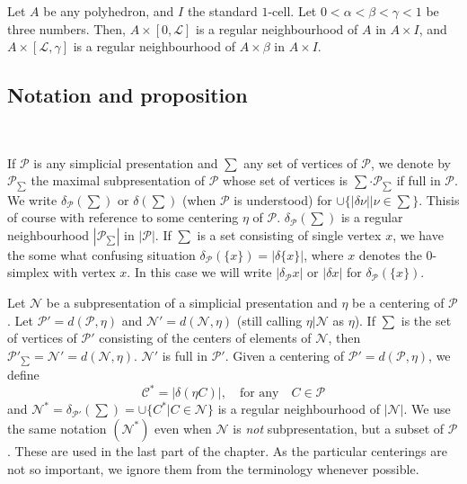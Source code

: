 \begin{ex}\label{chap6-ex6.3.9}
Let $A$ be any polyhedron, and $I$ the standard $1$-cell. Let $0<\alpha<\beta<\gamma<1$ be three numbers. Then, $A\times[0,\mathcal{L}]$ is a regular neighbourhood of $A$ in $A\times I$, and $A\times [\mathcal{L},\gamma]$ is a regular neighbourhood of $A\times \beta$ in $A\times I$.
\end{ex}

\setcounter{subsection}{9}
\subsection{Notation and proposition}\label{chap6-sec6.3.10}

~\phantom{a}

If $\mathscr{P}$ is any simplicial presentation and $\sum$ any set of vertices of $\mathscr{P}$, we denote by $\mathscr{P}_{\sum}$ the maximal subpresentation of $\mathscr{P}$ whose set of vertices is $\sum\cdot \mathscr{P}_{\sum}$ if full in $\mathscr{P}$. We write $\delta_{\mathscr{P}}(\sum)$ or $\delta(\sum)$ (when $\mathscr{P}$ is understood) for $\cup\{|\delta\nu||\nu\in \sum\}$. This\pageoriginale is of course with reference to some centering $\eta$ of $\mathscr{P}$. $\delta_{\mathscr{P}}(\sum)$ is a regular neighbourhood $|\mathscr{P}_{\sum}|$ in $|\mathscr{P}|$. If $\sum$ is a set consisting of single vertex $x$, we have the some what confusing situation $\delta_{\mathscr{P}}(\{x\})=|\delta\{x\}|$, where $x$ denotes the $0$-simplex with vertex $x$. In this case we will write $|\delta_{\mathscr{P}}x|$ or $|\delta x|$ for $\delta_{\mathscr{P}}(\{x\})$.

Let $\mathscr{N}$ be a subpresentation of a simplicial presentation and $\eta$ be a centering of $\mathscr{P}$. Let $\mathscr{P}'=d(\mathscr{P},\eta)$ and $\mathscr{N}'=d(\mathscr{N},\eta)$ (still calling $\eta|\mathscr{N}$ as $\eta$). If $\sum$ is the set of vertices of $\mathscr{P}'$ consisting of the centers of elements of $\mathscr{N}$, then $\mathscr{P}'_{\sum}=\mathscr{N}'=d(\mathscr{N},\eta)$. $\mathscr{N}'$ is full in $\mathscr{P}'$. Given a centering of $\mathscr{P}'=d(\mathscr{P},\eta)$, we define
$$
\mathscr{C}^{*}=|\delta(\eta C)|,\quad\text{for any}\quad C\in\mathscr{P}
$$
and $\mathscr{N}^{*}=\delta_{\mathscr{P}'}(\sum)=\cup \{C^{*}|C\in \mathscr{N}\}$ is a regular neighbourhood of $|\mathscr{N}|$. We use the same notation $(\mathscr{N}^{*})$ even when $\mathscr{N}$ is {\em not} subpresentation, but a subset of $\mathscr{P}$. These are used in the last part of the chapter. As the particular centerings are not so important, we ignore them from the terminology whenever possible.

